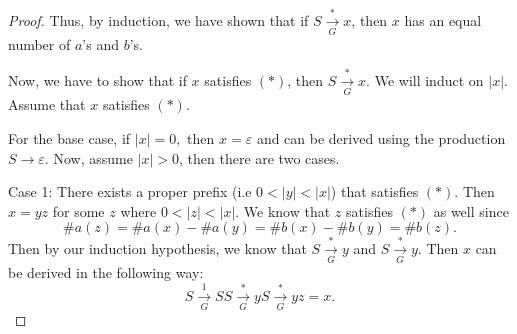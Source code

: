 \documentclass{article}
\renewcommand{\epsilon}{\varepsilon}
\theoremstyle{definition}
\begin{document}
\begin{enumerate}
\begin{proof}
		Thus, by induction, we have shown that if $S \xrightarrow[G]{*} x$, then $x$ has an equal number of $a$'s and $b$'s. 
		
		Now, we have to show that if $x$ satisfies $(*)$, then $S \xrightarrow[G]{*} x$. We will induct on $|x|$. Assume that $x$ satisfies $(*)$. 
		
		For the base case, if $|x| = 0,$ then $x = \epsilon$ and can be derived using the production $S \to \epsilon$. Now, assume $|x| >0$, then there are two cases. 
		
		Case 1: There exists a proper prefix (i.e $0 < |y| < |x|$) that satisfies $(*)$.  Then $x = yz$ for some $z$ where $0 < |z| < |x|$. We know that $z$ satisfies $(*)$ as well since
		\[\#a(z) = \#a(x)-\#a(y) = \#b(x)-\#b(y)=\#b(z).\]
		Then by our induction hypothesis, we know that $S \xrightarrow[G]{*} y$ and $S \xrightarrow[G]{*} y$. Then $x$ can be derived in the following way:
		\[S \xrightarrow[G]{1} SS \xrightarrow[G]{*} yS \xrightarrow[G]{*} yz = x.\]
		

\end{proof}
\end{enumerate}
\end{document}
